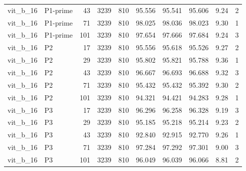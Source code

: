 \begin{longtable}{p{2.25cm}p{1.1cm}rrrrrrrr}
vit\_b\_16 & P1-prime & 43 & 3239 & 810 & 95.556 & 95.541 & 95.606 & 9.24 & 2 \\ 
vit\_b\_16 & P1-prime & 71 & 3239 & 810 & 98.025 & 98.036 & 98.023 & 9.30 & 1 \\ 
vit\_b\_16 & P1-prime & 101 & 3239 & 810 & 97.654 & 97.666 & 97.684 & 9.24 & 3 \\ 
vit\_b\_16 & P2 & 17 & 3239 & 810 & 95.556 & 95.618 & 95.526 & 9.27 & 2 \\ 
vit\_b\_16 & P2 & 29 & 3239 & 810 & 95.802 & 95.821 & 95.788 & 9.36 & 1 \\ 
vit\_b\_16 & P2 & 43 & 3239 & 810 & 96.667 & 96.693 & 96.688 & 9.32 & 3 \\ 
vit\_b\_16 & P2 & 71 & 3239 & 810 & 95.432 & 95.432 & 95.392 & 9.30 & 2 \\ 
vit\_b\_16 & P2 & 101 & 3239 & 810 & 94.321 & 94.421 & 94.283 & 9.28 & 1 \\ 
vit\_b\_16 & P3 & 17 & 3239 & 810 & 96.296 & 96.258 & 96.328 & 9.19 & 3 \\ 
vit\_b\_16 & P3 & 29 & 3239 & 810 & 95.185 & 95.218 & 95.214 & 9.23 & 2 \\ 
vit\_b\_16 & P3 & 43 & 3239 & 810 & 92.840 & 92.915 & 92.770 & 9.26 & 1 \\ 
vit\_b\_16 & P3 & 71 & 3239 & 810 & 97.284 & 97.292 & 97.301 & 9.00 & 3 \\ 
vit\_b\_16 & P3 & 101 & 3239 & 810 & 96.049 & 96.039 & 96.066 & 8.81 & 2 \\ 
\end{longtable}
